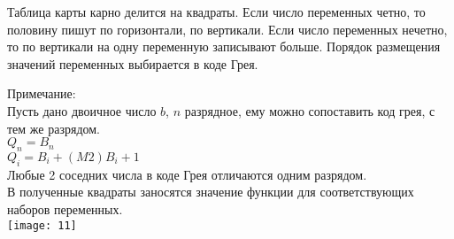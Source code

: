 Таблица карты карно делится на квадраты. Если число переменных четно,
то половину пишут по горизонтали, по вертикали. Если число переменных нечетно,
то по вертикали на одну переменную записывают больше.
Порядок размещения значений переменных выбирается в коде Грея.

Примечание:\\
Пусть дано двоичное число $b$, $n$ разрядное, ему можно сопоставить код грея, с тем же разрядом.\\
$Q_n = B_n$\\
$Q_i = B_i +(M2) B_i + 1$\\
Любые 2 соседних числа в коде Грея отличаются одним разрядом.\\
В полученные квадраты заносятся значение функции для соответствующих наборов переменных.\\
\texttt{[image: 11]}
